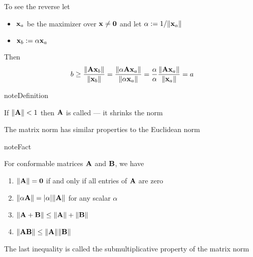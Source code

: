 \documentclass[letterpaper,10pt,english]{jupyterBook}
\begin{document}
\sphinxAtStartPar
To see the reverse let
\begin{itemize}
\item {} 
\sphinxAtStartPar
\({\bf x}_a\) be the maximizer over \({\bf x} \ne {\bf 0}\) and
let \(\alpha := 1 / \| {\bf x}_a\|\)

\item {} 
\sphinxAtStartPar
\({\bf x}_b := \alpha {\bf x}_a \)

\end{itemize}

\sphinxAtStartPar
Then
\begin{equation*}
\begin{split}
%
b 
\geq \frac{ \| {\bf A} {\bf x}_b \| }{ \| {\bf x}_b \|}
= \frac{ \| \alpha {\bf A} {\bf x}_a \| }{ \| \alpha {\bf x}_a \|}
= \frac{\alpha}{\alpha} \frac{\| {\bf A} {\bf x}_a \|}{ \| {\bf x}_a \|}
= a
%
\end{split}
\end{equation*}


\begin{sphinxadmonition}{note}{Definition}

\sphinxAtStartPar
If \(\| {\bf A} \| < 1\) then \({\bf A}\) is called  — it
shrinks the norm
\end{sphinxadmonition}

\begin{figure}[htbp]
\centering

\noindent{}
\end{figure}

\sphinxAtStartPar
The matrix norm has similar properties to the Euclidean norm

\begin{sphinxadmonition}{note}{Fact}

\sphinxAtStartPar
For conformable matrices \({\bf A}\) and \({\bf B}\), we have
\begin{enumerate}
%
\item {} 
\sphinxAtStartPar
\(\| {\bf A} \| = {\bf 0}\) if and only if all entries of
\({\bf A}\) are zero

\item {} 
\sphinxAtStartPar
\(\| \alpha {\bf A} \| = |\alpha| \| {\bf A} \|\) for any scalar
\(\alpha\)

\item {} 
\sphinxAtStartPar
\(\| {\bf A} + {\bf B} \| \leq \| {\bf A} \| + \| {\bf B} \|\)

\item {} 
\sphinxAtStartPar
\(\| {\bf A} {\bf B} \| \leq \| {\bf A} \| \| {\bf B} \|\)

\end{enumerate}

\sphinxAtStartPar
The last inequality is called the submultiplicative property of the matrix
norm
\end{sphinxadmonition}
\end{document}
